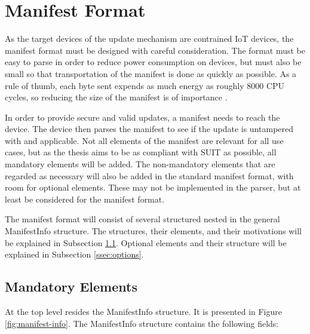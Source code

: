 \documentclass[0-thesis.tex]{subfiles}
\begin{document}

\section{Manifest Format}
\label{sec:manifest-format}
As the target devices of the update mechanism are contrained IoT devices, the manifest
format must be designed with careful consideration. The format must be easy to parse in
order to reduce power consumption on devices, but must also be small so that
transportation of the manifest is done as quickly as possible. As a rule of thumb, each
byte sent expends as much energy as roughly 8000 CPU cycles, so reducing the size of the
manifest is of importance \parencite{interconnecting}.



In order to provide secure and valid updates, a manifest needs to reach the device. The
device then parses the manifest to see if the update is untampered with and applicable.
Not all elements of the manifest are relevant for all use cases, but as the thesis aims to
be as compliant with SUIT as possible, all mandatory elements will be added. The
non-mandatory elements that are regarded as necessary will also be added in the standard
manifest format, with room for optional elements. These may not be implemented in the
parser, but at least be considered for the manifest format. %

The manifest format will consist of several structured nested in the general ManifestInfo
structure. The structures, their elements, and their motivations will be explained in
Subsection \ref{ssec:mandatory-elements}. Optional elements and their structure will be
explained in Subsection \ref{ssec:options}.

\subsection{Mandatory Elements}
\label{ssec:mandatory-elements}
At the top level resides the ManifestInfo structure. It is presented in Figure
\ref{fig:manifest-info}. The ManifestInfo structure contains the following fields:
\end{document}
